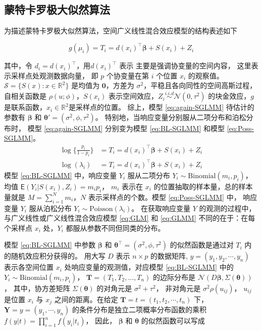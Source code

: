 \documentclass[12pt,a4paper,UTF8,twoside]{book}
\theoremstyle{definition}
\theoremstyle{definition}
\theoremstyle{definition}
\theoremstyle{remark}
\begin{document}
\hypertarget{subsec:MCML}{%
\subsection{蒙特卡罗极大似然算法}\label{subsec:MCML}}

为描述蒙特卡罗极大似然算法，空间广义线性混合效应模型的结构表述如下

\begin{equation}
g(\mu_i) = T_{i} = d(x_i)^{\top}\boldsymbol{\beta} + S(x_i) + Z_i \label{eq:again-SGLMM}
\end{equation}

\noindent 其中，令 \(d_{i} = d(x_i)^{\top}\)，用\(d(x_i)^{\top}\) 表示 主要是强调协变量的空间内容， 这里表示采样点处观测数据向量， 即 \(p\) 个协变量在第 \(i\) 个位置 \(x_i\) 的观察值。 \(\mathcal{S} = \{S(x): x \in \mathbb{R}^2\}\) 是均值为 \(\mathbf{0}\)，方差为 \(\sigma^2\)，平稳且各向同性的空间高斯过程，自相关函数是 \(\rho(u;\phi)\)，\(S(x_i)\) 表示空间效应，\(Z_i \stackrel{i.i.d}{\sim} \mathcal{N}(0,\tau^2)\) 的块金效应，\(g\) 是联系函数，\(x_i \in \mathbb{R}^2\)是采样点的位置。 综上，模型 \eqref{eq:again-SGLMM} 待估计的参数有 \(\boldsymbol{\beta}\) 和 \(\boldsymbol{\theta}' = (\sigma^2,\phi,\tau^2)\)。 特别地，当响应变量分别服从二项分布和泊松分布时， 模型 \eqref{eq:again-SGLMM} 分别变为模型 \eqref{eq:BL-SGLMM} 和模型 \eqref{eq:Poss-SGLMM}。
\begin{align}
\log\{\frac{p_i}{1-p_i}\} & = T_{i} = d(x_i)^{\top}\boldsymbol{\beta} + S(x_i) + Z_i  \label{eq:BL-SGLMM}\\
\log(\lambda_i)           & = T_{i} = d(x_i)^{\top}\boldsymbol{\beta} + S(x_i) + Z_i  \label{eq:Poss-SGLMM}
\end{align}
\noindent 模型 \eqref{eq:BL-SGLMM} 中，响应变量 \(Y_i\) 服从二项分布 \(Y_i \sim \mathrm{Binomial}(m_i,p_i)\)， 均值 \(\mathsf{E}(Y_i|S(x_i),Z_i)=m_{i}p_{i}\)， \(m_i\) 表示在 \(x_i\) 的位置抽取的样本量，总的样本量就是 \(M = \sum_{i=1}^{N}m_i\)，\(N\) 表示采样点的个数。模型 \eqref{eq:Poss-SGLMM} 中， 响应变量 \(Y_i\) 服从泊松分布 \(Y_i \sim \mathrm{Poisson}(\lambda_i)\)。 在获取响应变量 \(Y\) 的观测的过程中，与广义线性或广义线性混合效应模型 \eqref{eq:GLM} 和 \eqref{eq:GLMM} 不同的在于：在每个采样点 \(x_i\) 处，\(Y_i\) 都服从参数不同但同类的分布。

模型 \eqref{eq:BL-SGLMM} 中参数 \(\boldsymbol{\beta}\) 和 \(\boldsymbol{\theta}^{\top} = (\sigma^2,\phi,\tau^2)\) 的似然函数是通过对 \(T_i\) 内的随机效应积分获得的。 用大写 \(D\) 表示 \(n\times p\) 的数据矩阵, \(y = (y_1, y_2,\cdots, y_n)\) 表示各空间位置 \(x_i\) 处响应变量的观测值，对应模型 \eqref{eq:BL-SGLMM} 中的 \(Y_i \sim \mathrm{Binomial}(m_i,p_i)\)， \(\mathbf{T} = (T_1,T_2,\ldots,T_n)\) 的边际分布是 \(\mathcal{N}(D\boldsymbol{\beta}, \Sigma(\boldsymbol{\theta}))\)， 其中，协方差矩阵 \(\Sigma(\boldsymbol{\theta})\) 的对角元是 \(\sigma^2+\tau^2\)， 非对角元是 \(\sigma^2\rho(u_{ij})\)， \(u_{ij}\) 是位置 \(x_i\) 与 \(x_j\) 之间的距离。在给定 \(\mathbf{T} = t = (t_1,t_2,\cdots,t_n)\) 下， \(\mathbf{Y} = y =(y_1,\cdots,y_n)\) 的条件分布是独立二项概率分布函数的乘积 \(f(y|t)=\prod_{i=1}^{n}f(y_{i}|t_{i})\)， 因此， \(\boldsymbol{\beta}\) 和 \(\boldsymbol{\theta}\) 的似然函数可以写成
\end{document}
